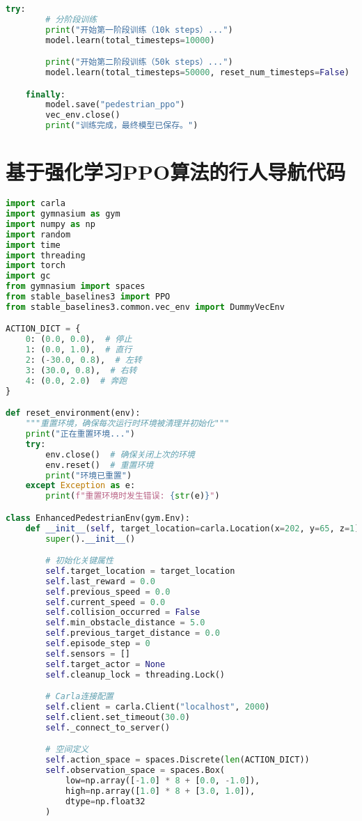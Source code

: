 \begin{lstlisting}[language=Python]
    try:
        # 分阶段训练
        print("开始第一阶段训练（10k steps）...")
        model.learn(total_timesteps=10000)

        print("开始第二阶段训练（50k steps）...")
        model.learn(total_timesteps=50000, reset_num_timesteps=False)

    finally:
        model.save("pedestrian_ppo")
        vec_env.close()
        print("训练完成，最终模型已保存。")
\end{lstlisting}

\section{基于强化学习PPO算法的行人导航代码}

\begin{lstlisting}[language=Python]
import carla
import gymnasium as gym
import numpy as np
import random
import time
import threading
import torch
import gc
from gymnasium import spaces
from stable_baselines3 import PPO
from stable_baselines3.common.vec_env import DummyVecEnv

ACTION_DICT = {
    0: (0.0, 0.0),  # 停止
    1: (0.0, 1.0),  # 直行
    2: (-30.0, 0.8),  # 左转
    3: (30.0, 0.8),  # 右转
    4: (0.0, 2.0)  # 奔跑
}

def reset_environment(env):
    """重置环境，确保每次运行时环境被清理并初始化"""
    print("正在重置环境...")
    try:
        env.close()  # 确保关闭上次的环境
        env.reset()  # 重置环境
        print("环境已重置")
    except Exception as e:
        print(f"重置环境时发生错误: {str(e)}")

class EnhancedPedestrianEnv(gym.Env):
    def __init__(self, target_location=carla.Location(x=202, y=65, z=1)):
        super().__init__()

        # 初始化关键属性
        self.target_location = target_location
        self.last_reward = 0.0
        self.previous_speed = 0.0
        self.current_speed = 0.0
        self.collision_occurred = False
        self.min_obstacle_distance = 5.0
        self.previous_target_distance = 0.0
        self.episode_step = 0
        self.sensors = []
        self.target_actor = None
        self.cleanup_lock = threading.Lock()

        # Carla连接配置
        self.client = carla.Client("localhost", 2000)
        self.client.set_timeout(30.0)
        self._connect_to_server()

        # 空间定义
        self.action_space = spaces.Discrete(len(ACTION_DICT))
        self.observation_space = spaces.Box(
            low=np.array([-1.0] * 8 + [0.0, -1.0]),
            high=np.array([1.0] * 8 + [3.0, 1.0]),
            dtype=np.float32
        )


\end{lstlisting}
